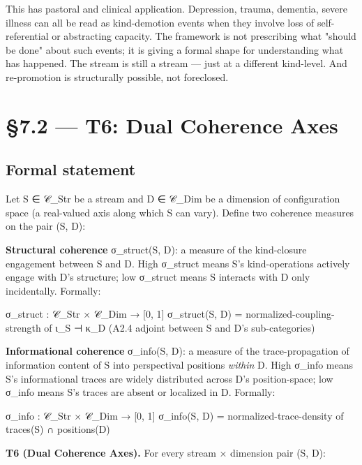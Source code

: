 \documentclass[11pt, openany]{book}
\newcommand{\sectionbreak}{\clearpage}
\begin{document}
This has pastoral and clinical application. Depression, trauma, dementia, severe illness can all be read as kind-demotion events when they involve loss of self-referential or abstracting capacity. The framework is not prescribing what "should be done" about such events; it is giving a formal shape for understanding what has happened. The stream is still a stream --- just at a different kind-level. And re-promotion is structurally possible, not foreclosed.

\sectionbreak

\section{§7.2 --- T6: Dual Coherence Axes}

\subsection{Formal statement}

Let S ∈ 𝒞\_\allowbreak{}Str be a stream and D ∈ 𝒞\_\allowbreak{}Dim be a dimension of configuration space (a real-valued axis along which S can vary). Define two coherence measures on the pair (S, D):

\textbf{Structural coherence} σ\_\allowbreak{}struct(S, D): a measure of the kind-closure engagement between S and D. High σ\_\allowbreak{}struct means S's kind-operations actively engage with D's structure; low σ\_\allowbreak{}struct means S interacts with D only incidentally. Formally:

\begin{Code}
σ_struct : 𝒞_Str × 𝒞_Dim → [0, 1]
σ_struct(S, D) = normalized-coupling-strength of ι_S ⊣ κ_D (A2.4 adjoint between S and D's sub-categories)
\end{Code}

\textbf{Informational coherence} σ\_\allowbreak{}info(S, D): a measure of the trace-propagation of information content of S into perspectival positions \textit{within} D. High σ\_\allowbreak{}info means S's informational traces are widely distributed across D's position-space; low σ\_\allowbreak{}info means S's traces are absent or localized in D. Formally:

\begin{Code}
σ_info : 𝒞_Str × 𝒞_Dim → [0, 1]
σ_info(S, D) = normalized-trace-density of traces(S) ∩ positions(D)
\end{Code}

\textbf{T6 (Dual Coherence Axes).} For every stream × dimension pair (S, D):
\end{document}
